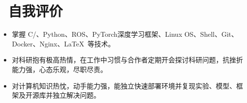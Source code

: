 \documentclass[11pt]{article}
\begin{document}


\section{\texorpdfstring{\makebox[\widthof{\faIdCard}][c]{\color{ZZU_BLUE}\faIdCard}\ 自我评价}{自我评价}}

\begin{itemize}
    \item {掌握 C/\CC、Python、ROS、PyTorch深度学习框架、Linux OS、Shell、Git、Docker、Nginx、\LaTeX \ 等技术。}
    \item {对科研抱有极高热情，在工作中习惯与合作者定期开会探讨科研问题，抗挫折能力强，心态乐观，尽职尽责。}
    \item {对计算机知识热忱，动手能力强，能独立快速部署环境并复现实验、模型、框架及开源库并独立解决问题。}
\end{itemize}

\end{document}
